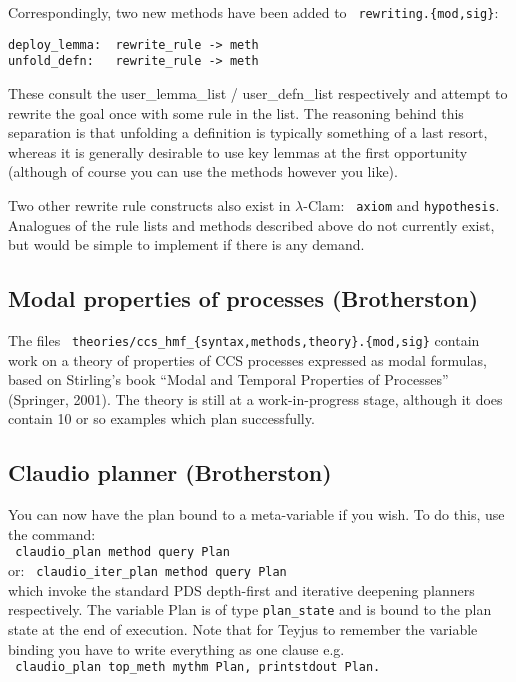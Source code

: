 \documentclass[11pt]{article}
\begin{document}
\noindent Correspondingly, two new methods have been added to {\tt
  rewriting.\{mod,sig\}}:
\begin{verbatim}
deploy_lemma:  rewrite_rule -> meth
unfold_defn:   rewrite_rule -> meth
\end{verbatim}
These consult the user\_lemma\_list / user\_defn\_list respectively
and attempt to rewrite the goal once with some rule in the list.  The
reasoning behind this separation is that unfolding a definition is
typically something of a last resort, whereas it is generally
desirable to use key lemmas at the first opportunity (although of
course you can use the methods however you like).

Two other rewrite rule constructs also exist in $\lambda$-Clam: {\tt
  axiom} and {\tt hypothesis}.  Analogues of the rule lists and
methods described above do not currently exist, but would be simple to
implement if there is any demand.

\subsection{Modal properties of processes (Brotherston)}
The files {\tt
  theories/ccs\_hmf\_\{syntax,methods,theory\}.\{mod,sig\}} contain
work on a theory of properties of CCS processes expressed as modal
formulas, based on Stirling's book ``Modal and Temporal Properties of
Processes'' (Springer, 2001).  The theory is still at a
work-in-progress stage, although it does contain 10 or so examples
which plan successfully.

\subsection{Claudio planner (Brotherston)}
You can now have the plan bound to a meta-variable if you wish.  To do
this, use the command: \\

\verb+ claudio_plan method query Plan + \\
or:  \verb+ claudio_iter_plan method query Plan + \\

\noindent which invoke the standard PDS depth-first and iterative deepening
planners respectively.  The variable Plan is of type
\texttt{plan\_state} and is bound to the plan state at the end of
execution.  Note that for Teyjus to remember the variable binding you
have to write everything as one clause e.g. \\

\verb+ claudio_plan top_meth mythm Plan, printstdout Plan.+
\end{document}
